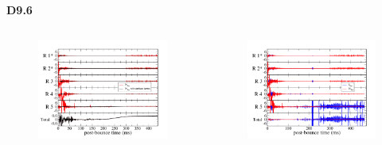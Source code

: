 \documentclass[aspectratio=169]{beamer}
\begin{document}
\begin{frame}

  \centerline{\textbf{D9.6}}

  \begin{columns}[c]

    \begin{figure}
      \includegraphics[width=1.0\textwidth]{Figures/D9.6_N2mvsN2mbar.pdf}
    \end{figure}

    \begin{figure}
      \includegraphics[width=1.0\textwidth]{Figures/D9.6_N2mvsI2m.pdf}
    \end{figure}

  \end{columns}

\end{frame}
\end{document}
